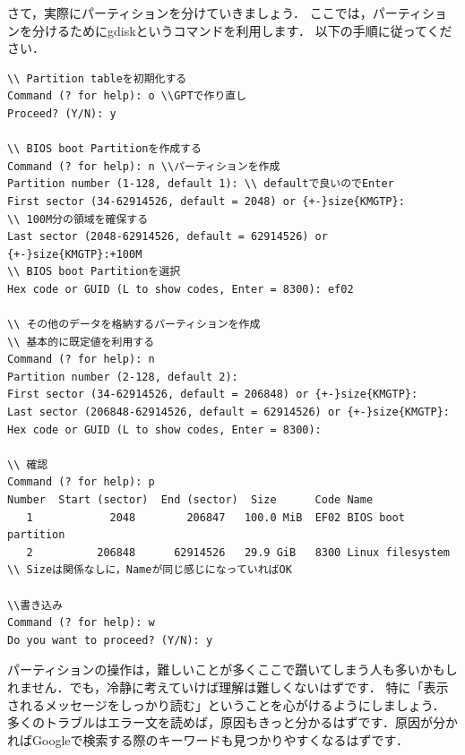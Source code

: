 \documentclass[b5j,twoside,openany]{jsbook}
\begin{document}
      さて，実際にパーティションを分けていきましょう．
      ここでは，パーティションを分けるためにgdiskというコマンドを利用します．
      以下の手順に従ってください．
      \begin{screen}
\begin{verbatim}
\\ Partition tableを初期化する
Command (? for help): o \\GPTで作り直し
Proceed? (Y/N): y 

\\ BIOS boot Partitionを作成する
Command (? for help): n \\パーティションを作成
Partition number (1-128, default 1): \\ defaultで良いのでEnter
First sector (34-62914526, default = 2048) or {+-}size{KMGTP}:
\\ 100M分の領域を確保する
Last sector (2048-62914526, default = 62914526) or {+-}size{KMGTP}:+100M
\\ BIOS boot Partitionを選択
Hex code or GUID (L to show codes, Enter = 8300): ef02

\\ その他のデータを格納するパーティションを作成
\\ 基本的に既定値を利用する
Command (? for help): n
Partition number (2-128, default 2): 
First sector (34-62914526, default = 206848) or {+-}size{KMGTP}: 
Last sector (206848-62914526, default = 62914526) or {+-}size{KMGTP}: 
Hex code or GUID (L to show codes, Enter = 8300): 

\\ 確認
Command (? for help): p
Number  Start (sector)  End (sector)  Size      Code Name
   1            2048        206847   100.0 MiB  EF02 BIOS boot partition
   2          206848      62914526   29.9 GiB   8300 Linux filesystem
\\ Sizeは関係なしに，Nameが同じ感じになっていればOK

\\書き込み
Command (? for help): w
Do you want to proceed? (Y/N): y
\end{verbatim}
      \end{screen}
      パーティションの操作は，難しいことが多くここで躓いてしまう人も多いかもしれません．でも，冷静に考えていけば理解は難しくないはずです．
      特に「表示されるメッセージをしっかり読む」ということを心がけるようにしましょう．
      多くのトラブルはエラー文を読めば，原因もきっと分かるはずです．原因が分かればGoogleで検索する際のキーワードも見つかりやすくなるはずです．
\end{document}
